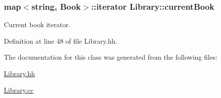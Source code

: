 \subsubsection[{\texorpdfstring{current\+Book}{currentBook}}]{\setlength{\rightskip}{0pt plus 5cm}map$<$string, {\bf Book}$>$\+::iterator Library\+::current\+Book\hspace{0.3cm}{\ttfamily [private]}}\hypertarget{class_library_a78a4071e8d610da671b3886c71900dae}{}\label{class_library_a78a4071e8d610da671b3886c71900dae}


Current book iterator. 



Definition at line 48 of file Library.\+hh.



The documentation for this class was generated from the following files\+:\begin{DoxyCompactItemize}
\item 
\hyperlink{_library_8hh}{Library.\+hh}\item 
\hyperlink{_library_8cc}{Library.\+cc}\end{DoxyCompactItemize}
